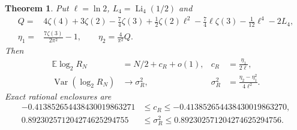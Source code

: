 \documentclass[11pt,a4paper]{article}
\numberwithin{equation}{section}
\newtheorem{theorem}{Theorem}[section]
\theoremstyle{remark}
\newcommand{\E}{\mathbb E}
\begin{document}
\begin{theorem}\label{thm:limit}
Put $\ell=\ln2$, $L_4=\operatorname{Li}_4(1/2)$ and
\begin{align*}
Q={}&4\zeta(4)+3\zeta(2)-\tfrac74\zeta(3)
+\tfrac12\zeta(2)\ell^2-\tfrac74\ell\zeta(3)-\tfrac1{12}\ell^4-2L_4,\\
\eta_1={}&\frac{7\zeta(3)}{2\pi^2}-1,\qquad \eta_2=\frac4{\pi^2}Q.
\end{align*}
Then
\begin{align}
\E\log_2R_N&=N/2+c_R+o(1),&c_R&=\frac{\eta_1}{2\ell},\label{eq:asymmean}\\
\operatorname{Var}(\log_2R_N)&\longrightarrow\sigma_R^2,&
\sigma_R^2&=\frac{\eta_2-\eta_1^2}{4\ell^2}.\label{eq:asymvariance}
\end{align}
Exact rational enclosures are
\begin{align*}
-0.413852654438430019863271&\le c_R\le-0.413852654438430019863270,\\
0.892302571204274625294755&\le\sigma_R^2\le0.892302571204274625294756.
\end{align*}
\end{theorem}
\end{document}
